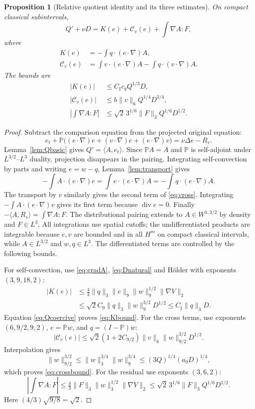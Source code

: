 \documentclass[11pt,a4paper]{article}
\newtheorem{proposition}[theorem]{Proposition}
\theoremstyle{definition}\newtheorem{definition}[theorem]{Definition}
\theoremstyle{remark}\newtheorem{remark}[theorem]{Remark}
\newcommand{\PP}{\mathbb P}
\newcommand{\norm}[1]{\lVert #1\rVert}
\newcommand{\ip}[2]{\langle #1,#2\rangle}
\newcommand{\diver}{\operatorname{div}}
\newcommand{\Csharp}{C_\sharp}
\numberwithin{equation}{section}
\begin{document}
\begin{proposition}[Relative quotient identity and its three estimates]\label{prop:relative}
On compact classical subintervals,
\begin{equation}\label{eq:relidentity}
 Q'+\nu D=K(e)+\mathcal C_v(e)+\int\nabla A:F,
\end{equation}
where
\begin{align}
 K(e)&=-\int q\cdot(e\cdot\nabla)A,\label{eq:K}\\
 \mathcal C_v(e)&=\int v\cdot(e\cdot\nabla)A
                 -\int q\cdot(v\cdot\nabla)A.\label{eq:cross}
\end{align}
The bounds are
\begin{align}
 |K(e)|&\le\Csharp c_qQ^{1/3}D,\label{eq:Kbound}\\
 |\mathcal C_v(e)|&\le b\norm v_6Q^{1/4}D^{3/4},\label{eq:crossbound}\\
 \left|\int\nabla A:F\right|&\le\sqrt2\,3^{1/6}\norm F_3Q^{1/6}D^{1/2}.
 \label{eq:Fbound}
\end{align}
\end{proposition}
\begin{proof}
Subtract the comparison equation from the projected original equation:
\[
 e_t+\PP\bigl((e\cdot\nabla)e+(v\cdot\nabla)e+(e\cdot\nabla)v\bigr)
 =\nu\Delta e-R_v.
\]
Lemma~\ref{lem:Qbasic} gives $Q'=\ip A{e_t}$. Since $\PP A=A$ and $\PP$ is self-adjoint under $L^{3/2}$--$L^3$ duality, projection disappears in the pairing. Integrating self-convection by parts and writing $e=w-q$, Lemma~\ref{lem:transport} gives
\[
 -\int A\cdot(e\cdot\nabla)e
 =\int e\cdot(e\cdot\nabla)A
 =-\int q\cdot(e\cdot\nabla)A.
\]
The transport by $v$ similarly gives the second term of \eqref{eq:cross}. Integrating $-\int A\cdot(e\cdot\nabla)v$ gives its first term because $\diver e=0$. Finally $-\ip A{R_v}=\int\nabla A:F$. The distributional pairing extends to $A\in W^{1,3/2}$ by density and $F\in L^3$. All integrations use spatial cutoffs; the undifferentiated products are integrable because $e,v$ are bounded and in all $H^m$ on compact classical intervals, while $A\in L^{3/2}$ and $w,q\in L^3$. The differentiated terms are controlled by the following bounds.

For self-convection, use \eqref{eq:gradA}, \eqref{eq:Dnatural} and H\"older with exponents $(3,9,18,2)$:
\begin{align*}
 |K(e)|&\le\tfrac43\norm q_3\norm e_9\norm w_9^{1/2}\norm{\nabla V}_2\\
 &\le\sqrt2 C_9\norm q_3\norm w_9^{3/2}D^{1/2}
 \le\Csharp\norm q_3D.
\end{align*}
Equation \eqref{eq:Qcoercive} proves \eqref{eq:Kbound}. For the cross terms, use exponents $(6,9/2,9,2)$, $e=\PP w$, and $q=(I-\PP)w$:
\[
 |\mathcal C_v(e)|\le\sqrt2(1+2C_{9/2})\norm v_6
 \norm w_{9/2}^{3/2}D^{1/2}.
\]
Interpolation gives
\[
 \norm w_{9/2}^{3/2}\le\norm w_3^{3/4}\norm w_9^{3/4}
 \le(3Q)^{1/4}(a_0D)^{1/4},
\]
which proves \eqref{eq:crossbound}. For the residual use exponents $(3,6,2)$:
\[
 \left|\int\nabla A:F\right|
 \le\tfrac43\norm F_3\norm w_3^{1/2}\norm{\nabla V}_2
 \le\sqrt2\,3^{1/6}\norm F_3Q^{1/6}D^{1/2}.
\]
Here $(4/3)\sqrt{9/8}=\sqrt2$.
\end{proof}
\end{document}
